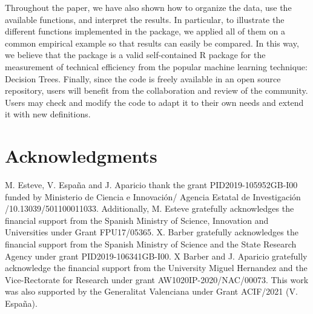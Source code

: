 Throughout the paper, we have also shown how to organize the data, use
the available functions, and interpret the results. In particular, to
illustrate the different functions implemented in the package, we
applied all of them on a common empirical example so that results can
easily be compared. In this way, we believe that the  package
is a valid self-contained R package for the measurement of technical
efficiency from the popular machine learning technique: Decision Trees.
Finally, since the code is freely available in an open source
repository, users will benefit from the collaboration and review of the
community. Users may check and modify the code to adapt it to their own
needs and extend it with new definitions.

\hypertarget{acknowledgments}{%
\section{Acknowledgments}\label{acknowledgments}}

M. Esteve, V. España and J. Aparicio thank the grant
PID2019-105952GB-I00 funded by Ministerio de Ciencia e Innovación/
Agencia Estatal de Investigación /10.13039/501100011033. Additionally,
M. Esteve gratefully acknowledges the financial support from the Spanish
Ministry of Science, Innovation and Universities under Grant
FPU17/05365. X. Barber gratefully acknowledges the financial support
from the Spanish Ministry of Science and the State Research Agency under
grant PID2019-106341GB-I00. X Barber and J. Aparicio gratefully
acknowledge the financial support from the University Miguel Hernandez
and the Vice-Rectorate for Research under grant AW1020IP-2020/NAC/00073.
This work was also supported by the Generalitat Valenciana under Grant
ACIF/2021 (V. España).



\address{%
Miriam Esteve\\
Miguel Hernandez University\\%
Center of Operations Research\\ 03202 Elche, Spain\\
%
\url{https://cio.umh.es/}\\%
\textit{ORCiD: \href{https://orcid.org/0000-0002-5908-0581}{0000-0002-5908-0581}}\\%
\href{mailto:miriam.estevec@umh.es}{\nolinkurl{miriam.estevec@umh.es}}%
}

\address{%
Victor España\\
Miguel Hernandez University\\%
Center of Operations Research\\ 03202 Elche, Spain\\
%
\url{https://cio.umh.es/}\\%
\textit{ORCiD: \href{https://orcid.org/0000-0002-1807-6180}{0000-0002-1807-6180}}\\%
\href{mailto:vespana@umh.es}{\nolinkurl{vespana@umh.es}}%
}

